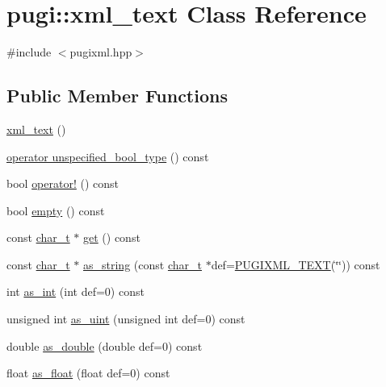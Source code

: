 \hypertarget{classpugi_1_1xml__text}{\section{pugi\-:\-:xml\-\_\-text Class Reference}
\label{classpugi_1_1xml__text}
}


{\ttfamily \#include $<$pugixml.\-hpp$>$}

\subsection*{Public Member Functions}
\begin{DoxyCompactItemize}
\item 
\hyperlink{classpugi_1_1xml__text_a54a5e99b0182c5e99779177acffd5989}{xml\-\_\-text} ()
\item 
\hyperlink{classpugi_1_1xml__text_a549820a92ece6ed347f721d7676822e5}{operator unspecified\-\_\-bool\-\_\-type} () const 
\item 
bool \hyperlink{classpugi_1_1xml__text_ab75d176a3c799a4638ac298390dbed4c}{operator!} () const 
\item 
bool \hyperlink{classpugi_1_1xml__text_a673a7eac0048e7bcdfd32ee6a5820798}{empty} () const 
\item 
const \hyperlink{namespacepugi_aef5a7a62cba0507542220ea15afe39df}{char\-\_\-t} $\ast$ \hyperlink{classpugi_1_1xml__text_acf75854306f4756904b6ef140ba1b53f}{get} () const 
\item 
const \hyperlink{namespacepugi_aef5a7a62cba0507542220ea15afe39df}{char\-\_\-t} $\ast$ \hyperlink{classpugi_1_1xml__text_ac817e480d7ab09b3c6390622423a701b}{as\-\_\-string} (const \hyperlink{namespacepugi_aef5a7a62cba0507542220ea15afe39df}{char\-\_\-t} $\ast$def=\hyperlink{pugixml_8hpp_ad5475bca2e336810ae5906349e644d0b}{P\-U\-G\-I\-X\-M\-L\-\_\-\-T\-E\-X\-T}(\char`\"{}\char`\"{})) const 
\item 
int \hyperlink{classpugi_1_1xml__text_a71d4c7ed3d12dc6e8ee2a81d293fe9f4}{as\-\_\-int} (int def=0) const 
\item 
unsigned int \hyperlink{classpugi_1_1xml__text_a9eb828629c4ca107d06d28a60f5bb114}{as\-\_\-uint} (unsigned int def=0) const 
\item 
double \hyperlink{classpugi_1_1xml__text_aa6722fcf1c4e10ee11b6df73bef11cee}{as\-\_\-double} (double def=0) const 
\item 
float \hyperlink{classpugi_1_1xml__text_a158482df06cd778542d7cedb1c33e39f}{as\-\_\-float} (float def=0) const 

\end{DoxyCompactItemize}
